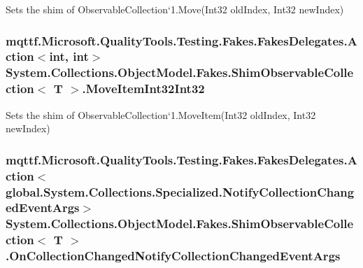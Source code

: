Sets the shim of Observable\-Collection`1.Move(\-Int32 old\-Index, Int32 new\-Index)

\hypertarget{class_system_1_1_collections_1_1_object_model_1_1_fakes_1_1_shim_observable_collection_3_01_t_01_4_ad7a098ba84a77df28a0e7c9a4b4fabb4}{
\subsubsection[{Move\-Item\-Int32\-Int32}]{\setlength{\rightskip}{0pt plus 5cm}mqttf.\-Microsoft.\-Quality\-Tools.\-Testing.\-Fakes.\-Fakes\-Delegates.\-Action$<$int, int$>$ System.\-Collections.\-Object\-Model.\-Fakes.\-Shim\-Observable\-Collection$<$ T $>$.Move\-Item\-Int32\-Int32\hspace{0.3cm}{\ttfamily [set]}}}\label{class_system_1_1_collections_1_1_object_model_1_1_fakes_1_1_shim_observable_collection_3_01_t_01_4_ad7a098ba84a77df28a0e7c9a4b4fabb4}


Sets the shim of Observable\-Collection`1.Move\-Item(\-Int32 old\-Index, Int32 new\-Index)

\hypertarget{class_system_1_1_collections_1_1_object_model_1_1_fakes_1_1_shim_observable_collection_3_01_t_01_4_ab3db256037a3b071b425b35090a3c7f6}{
\subsubsection[{On\-Collection\-Changed\-Notify\-Collection\-Changed\-Event\-Args}]{\setlength{\rightskip}{0pt plus 5cm}mqttf.\-Microsoft.\-Quality\-Tools.\-Testing.\-Fakes.\-Fakes\-Delegates.\-Action$<$global.\-System.\-Collections.\-Specialized.\-Notify\-Collection\-Changed\-Event\-Args$>$ System.\-Collections.\-Object\-Model.\-Fakes.\-Shim\-Observable\-Collection$<$ T $>$.On\-Collection\-Changed\-Notify\-Collection\-Changed\-Event\-Args\hspace{0.3cm}{\ttfamily [set]}}}\label{class_system_1_1_collections_1_1_object_model_1_1_fakes_1_1_shim_observable_collection_3_01_t_01_4_ab3db256037a3b071b425b35090a3c7f6}


